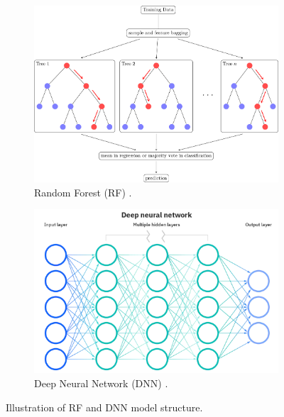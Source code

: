 \begin{figure}[h]
  \centering
  \begin{subfigure}[t]{0.5\textwidth}
    \includegraphics[width=\linewidth]{imgs/models/random-forest.png}
    \caption{Random Forest (RF) \citep{riebesellRandomForest2022}.} \label{fig:rf}
  \end{subfigure}%
  \hspace{3em}%
  \begin{subfigure}[t]{0.4\textwidth}
      \includegraphics[width=\linewidth]{imgs/models/DNN.png}
      \caption{Deep Neural Network (DNN) \citep{ibmNeuralNetworks2022}.} \label{fig:dnn}
  \end{subfigure}%
\caption{Illustration of RF and DNN model structure.} \label{fig:rf-dnn}
\end{figure}

